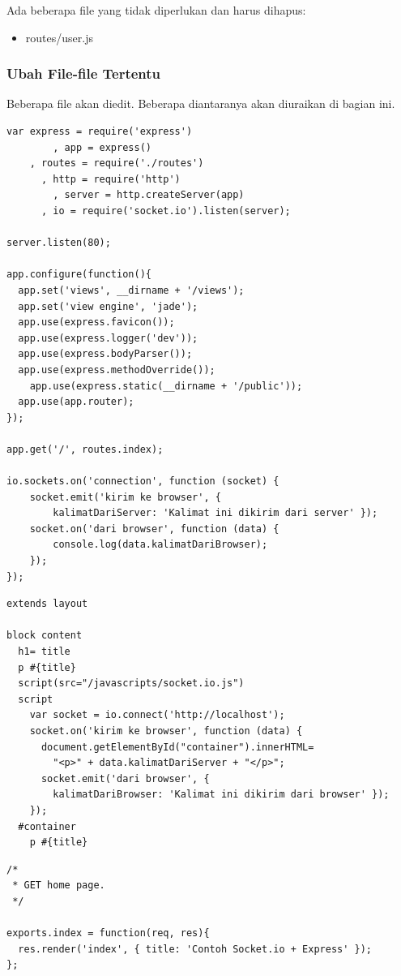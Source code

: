 Ada beberapa file yang tidak diperlukan dan harus dihapus:
\begin{itemize}
	\item routes/user.js
\end{itemize}

\subsubsection{Ubah File-file Tertentu}

Beberapa file akan diedit. Beberapa diantaranya akan diuraikan di bagian ini.

\lstset{language=JavaScript,caption=app.js}
\begin{lstlisting}
var express = require('express')
		, app = express()
  	, routes = require('./routes')
	  , http = require('http')
		, server = http.createServer(app)
	  , io = require('socket.io').listen(server);

server.listen(80);

app.configure(function(){
  app.set('views', __dirname + '/views');
  app.set('view engine', 'jade');
  app.use(express.favicon());
  app.use(express.logger('dev'));
  app.use(express.bodyParser());
  app.use(express.methodOverride());
	app.use(express.static(__dirname + '/public'));
  app.use(app.router);
});

app.get('/', routes.index);

io.sockets.on('connection', function (socket) {
	socket.emit('kirim ke browser', { 
		kalimatDariServer: 'Kalimat ini dikirim dari server' });
	socket.on('dari browser', function (data) {
		console.log(data.kalimatDariBrowser);
	});
});
\end{lstlisting}

\lstset{language=html,caption=views/index.jade}
\begin{lstlisting}
extends layout

block content
  h1= title
  p #{title}
  script(src="/javascripts/socket.io.js")
  script
    var socket = io.connect('http://localhost');
    socket.on('kirim ke browser', function (data) {
      document.getElementById("container").innerHTML=
        "<p>" + data.kalimatDariServer + "</p>";
      socket.emit('dari browser', { 
        kalimatDariBrowser: 'Kalimat ini dikirim dari browser' });
    });
  #container
    p #{title}
\end{lstlisting}

\lstset{language=html,caption=routes/index.js}
\begin{lstlisting}
/*
 * GET home page.
 */

exports.index = function(req, res){
  res.render('index', { title: 'Contoh Socket.io + Express' });
};
\end{lstlisting}

